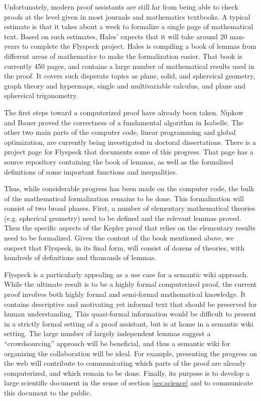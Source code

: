 
  Unfortunately, modern proof assistants are still far from being able to check
proofs at the level given in most journals and mathematics textbooks.  A typical
estimate is that it takes about a week to formalize a single page of mathematical
text.  Based on such estimates, Hales' expects that it will take 
around 20 man-years to complete the Flyspeck project.  
Hales is compiling a book\cite{Hales:2007:FlyspeckBook}
of lemmas from different areas of mathematics to make the formalization easier.    
That book is currently 450 pages, and contains a large number of mathematical
results used in the proof.  It covers such disperate topics
as plane, solid, and sphereical geometry, graph theory and hypermaps, single and
multivariable calculus, and plane and sphereical trigonometry.

The first steps toward a computerized proof have already been taken.
Nipkow and Bauer\cite{Nipkow:2005:Tame} proved the correctness of a
fundamental algorithm in Isabelle.  The other two main parts of the
computer code, linear programming and global optimization, are
currently being investigated in doctoral
dissertations\cite{Zumkeller:2006:TaylorModels,Obua:2005:LinearPrograms}.
There is a project page\cite{website:FlyspeckProjectPage} for Flyspeck
that documents some of this progress.  That page has a source
repository containing the book of lemmas, as well as the formalized
definitions of some important functions and inequalities.  

Thus, while
considerable progress has been made on the computer code, the bulk of
the mathematical formalization remains to be done.  This formalization
will consist of two broad phases.  First, a number of elementary
mathematical theories (e.g. spherical geometry) need to be defined and
the relevant lemmas proved.  Then the specific aspects of the Kepler
proof that relies on the elementary results need to be formalized.
Given the content of the book mentioned above, we suspect that
Flyspeck, in its final form, will consist of dozens of theories, with
hundreds of definitions and thousands of lemmas.

Flyspeck is a particularly appealing as a use case for a semantic wiki
approach. While the ultimate result is to be a highly formal
computerized proof, the current proof involves both highly formal and
semi-formal mathematical knowledge.  It contains descriptive and
motivating yet informal text that should be preserved for human
understanding.  This quasi-formal information would be difficult to
present in a strictly formal setting of a proof assistant, but is at
home in a semantic wiki setting.  The large number of largely
independent lemmas suggest a ``crowdsourcing'' approach will be
beneficial, and thus a semantic wiki for organizing the collaboration
will be ideal.  For example, presenting the progress on the web will
contribute to communicating which parts of the proof are already
computerized, and which remain to be done.  Finally, its purpose is to
develop a large scientific document in the sense of section
\ref{sec:science} and to communicate this document to the public.

